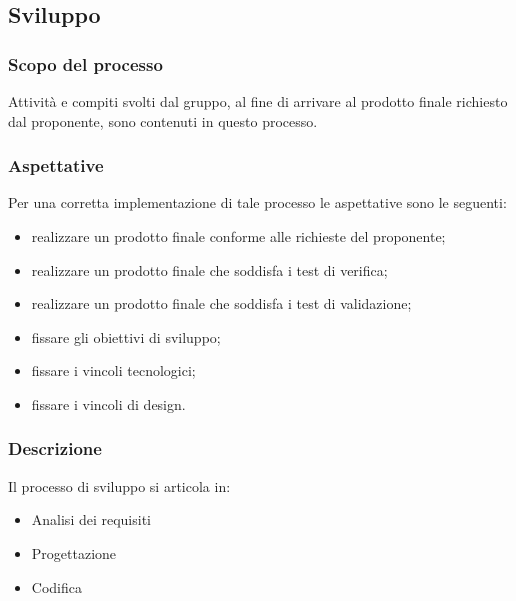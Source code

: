 \begin{itemize}

        
\subsection{Sviluppo}
\subsubsection{Scopo del processo}
Attività e compiti svolti dal gruppo, al fine di arrivare al prodotto finale richiesto dal proponente, sono contenuti in questo processo.
\subsubsection{Aspettative}
Per una corretta implementazione di tale processo le aspettative sono le seguenti:
\begin{itemize}
	\item realizzare un prodotto finale conforme alle richieste del proponente;
	\item realizzare un prodotto finale che soddisfa i test di verifica;
	\item realizzare un prodotto finale che soddisfa i test di validazione;
	\item fissare gli obiettivi di sviluppo;
	\item fissare i vincoli tecnologici;
	\item fissare i vincoli di design.
\end{itemize}
\subsubsection{Descrizione}
Il processo di sviluppo si articola in:
\begin{itemize}
	\item Analisi dei requisiti
	\item Progettazione
	\item Codifica	
\end{itemize}

\end{itemize}
